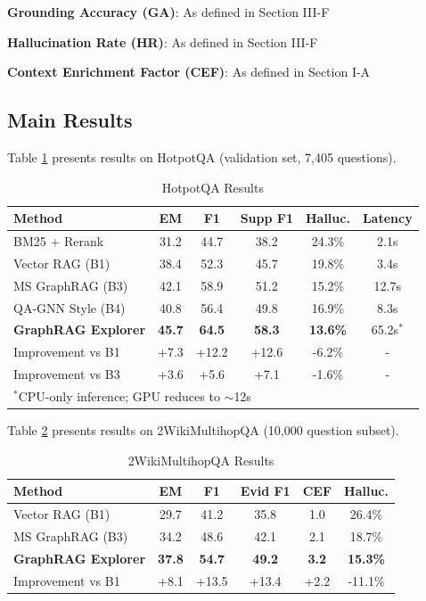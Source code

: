 \documentclass[conference]{IEEEtran}
\begin{document}
\textbf{Grounding Accuracy (GA)}: As defined in Section III-F

\textbf{Hallucination Rate (HR)}: As defined in Section III-F

\textbf{Context Enrichment Factor (CEF)}: As defined in Section I-A

\subsection{Main Results}

Table \ref{tab:hotpotqa} presents results on HotpotQA (validation set, 7,405 questions).

\begin{table}[htbp]
\caption{HotpotQA Results}
\label{tab:hotpotqa}
\centering
\begin{tabular}{lccccc}
\toprule
\textbf{Method} & \textbf{EM} & \textbf{F1} & \textbf{Supp F1} & \textbf{Halluc.} & \textbf{Latency} \\
\midrule
BM25 + Rerank & 31.2 & 44.7 & 38.2 & 24.3\% & 2.1s \\
Vector RAG (B1) & 38.4 & 52.3 & 45.7 & 19.8\% & 3.4s \\
MS GraphRAG (B3) & 42.1 & 58.9 & 51.2 & 15.2\% & 12.7s \\
QA-GNN Style (B4) & 40.8 & 56.4 & 49.8 & 16.9\% & 8.3s \\
\midrule
\textbf{GraphRAG Explorer} & \textbf{45.7} & \textbf{64.5} & \textbf{58.3} & \textbf{13.6\%} & 65.2s$^*$ \\
\midrule
Improvement vs B1 & +7.3 & +12.2 & +12.6 & -6.2\% & - \\
Improvement vs B3 & +3.6 & +5.6 & +7.1 & -1.6\% & - \\
\bottomrule
\multicolumn{6}{l}{\footnotesize $^*$CPU-only inference; GPU reduces to $\sim$12s}
\end{tabular}
\end{table}

Table \ref{tab:2wiki} presents results on 2WikiMultihopQA (10,000 question subset).

\begin{table}[htbp]
\caption{2WikiMultihopQA Results}
\label{tab:2wiki}
\centering
\begin{tabular}{lccccc}
\toprule
\textbf{Method} & \textbf{EM} & \textbf{F1} & \textbf{Evid F1} & \textbf{CEF} & \textbf{Halluc.} \\
\midrule
Vector RAG (B1) & 29.7 & 41.2 & 35.8 & 1.0 & 26.4\% \\
MS GraphRAG (B3) & 34.2 & 48.6 & 42.1 & 2.1 & 18.7\% \\
\midrule
\textbf{GraphRAG Explorer} & \textbf{37.8} & \textbf{54.7} & \textbf{49.2} & \textbf{3.2} & \textbf{15.3\%} \\
\midrule
Improvement vs B1 & +8.1 & +13.5 & +13.4 & +2.2 & -11.1\% \\
\bottomrule
\end{tabular}
\end{table}
\end{document}
